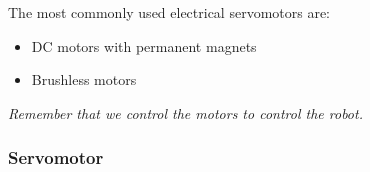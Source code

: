 The most commonly used electrical servomotors are:

\begin{itemize}
    \item DC motors with permanent magnets
    \item Brushless motors
\end{itemize}

\textit{Remember that we control the motors to control the robot.}

\newpage

\subsubsection*{Servomotor}

\begin{figure} 
  \vspace{-1.5\baselineskip}
  \centering

\end{figure}
